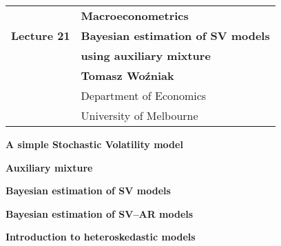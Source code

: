 \documentclass[notes,blackandwhite,mathsans,usenames,dvipsnames]{beamer}
\begin{document}







{
\begin{frame}

\vspace{1cm}
\begin{tabular}{rl}
&\textbf{\LARGE\color{mcxs2} Macroeconometrics}\\[8ex]
\textbf{\Large\color{mcxs2} Lecture 21}&\textbf{\Large\color{mcxs5}Bayesian estimation of SV models}\\
&\textbf{\Large\color{mcxs5}using auxiliary mixture}\\[18ex]
&\textbf{\color{mcxs2}Tomasz Wo\'zniak}\\[1ex]
&{\small\color{mcxs5} Department of Economics}\\
&{\small\color{mcxs5}University of Melbourne}
\end{tabular}

\end{frame}
}



{
\begin{frame}

\vspace{1cm}\textbf{\color{mcxs2}A simple Stochastic Volatility model}

\bigskip\textbf{\color{purple}Auxiliary mixture}

\bigskip\textbf{\color{mcxs2}Bayesian estimation of SV models}

\bigskip\textbf{\color{mcxs2}Bayesian estimation of SV--AR models}

\bigskip\textbf{\color{mcxs2}Introduction to heteroskedastic models}

\small
\bigskip{} 


\end{frame}
}
\end{document}
